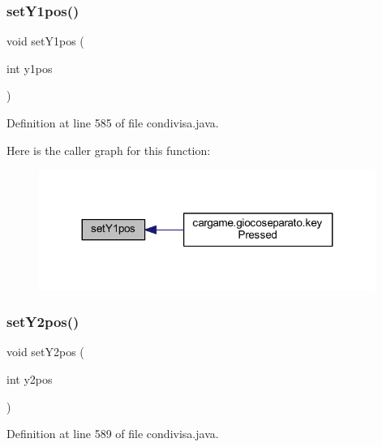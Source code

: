 \subsubsection{\texorpdfstring{set\+Y1pos()}{setY1pos()}}
{\footnotesize\ttfamily void set\+Y1pos (\begin{DoxyParamCaption}\item[{int}]{y1pos }\end{DoxyParamCaption})}



Definition at line 585 of file condivisa.\+java.

Here is the caller graph for this function\+:
\nopagebreak
\begin{figure}[H]
\begin{center}
\leavevmode
\includegraphics[width=311pt]{classcargame_1_1condivisa_aff8d76fefeea02298942a385888d8161_icgraph}
\end{center}
\end{figure}
\mbox{\label{classcargame_1_1condivisa_a596efa01b731811ef9e80909f32af69e}} 
\subsubsection{\texorpdfstring{set\+Y2pos()}{setY2pos()}}
{\footnotesize\ttfamily void set\+Y2pos (\begin{DoxyParamCaption}\item[{int}]{y2pos }\end{DoxyParamCaption})}



Definition at line 589 of file condivisa.\+java.

